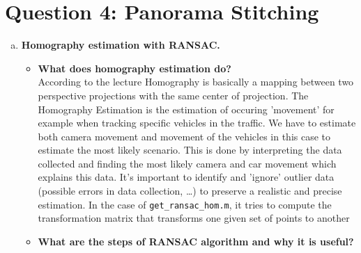 \documentclass[12pt]{article}
\begin{document}
\section*{Question 4: Panorama Stitching}
\begin{enumerate}[a)]
	\item 
	\textbf{Homography estimation with RANSAC.}
     \begin{itemize}
     	\item
     	\textbf{What does homography estimation do?}\\
        According to the lecture Homography is basically a mapping between two perspective projections with the same center of projection. The Homography Estimation is the estimation of occuring 'movement' for example when tracking specific vehicles in the traffic. We have to estimate both camera movement and movement of the vehicles in this case to estimate the most likely scenario. This is done by interpreting the data collected and finding the most likely camera and car movement which explains this data. It's important to identify and 'ignore' outlier data (possible errors in data collection, \dots) to preserve a realistic and precise estimation. In the case of \verb!get_ransac_hom.m!, it tries to compute the transformation matrix that transforms one given set of points to another

     	\item
     	\textbf{What are the steps of RANSAC algorithm and why it is useful?}\\

     \end{itemize}
\end{enumerate}
\end{document}
